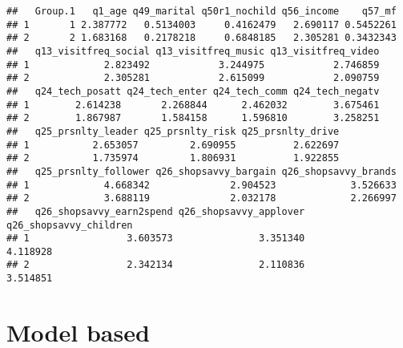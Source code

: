 \documentclass[]{article}
\newenvironment{Shaded}{\begin{snugshade}}{\end{snugshade}}
\newcommand{\KeywordTok}[1]{\textcolor[rgb]{0.13,0.29,0.53}{\textbf{#1}}}
\newcommand{\DataTypeTok}[1]{\textcolor[rgb]{0.13,0.29,0.53}{#1}}
\newcommand{\DecValTok}[1]{\textcolor[rgb]{0.00,0.00,0.81}{#1}}
\newcommand{\StringTok}[1]{\textcolor[rgb]{0.31,0.60,0.02}{#1}}
\newcommand{\OperatorTok}[1]{\textcolor[rgb]{0.81,0.36,0.00}{\textbf{#1}}}
\newcommand{\NormalTok}[1]{#1}
\begin{document}
\begin{verbatim}
##   Group.1   q1_age q49_marital q50r1_nochild q56_income    q57_mf
## 1       1 2.387772   0.5134003     0.4162479   2.690117 0.5452261
## 2       2 1.683168   0.2178218     0.6848185   2.305281 0.3432343
##   q13_visitfreq_social q13_visitfreq_music q13_visitfreq_video
## 1             2.823492            3.244975            2.746859
## 2             2.305281            2.615099            2.090759
##   q24_tech_posatt q24_tech_enter q24_tech_comm q24_tech_negatv
## 1        2.614238       2.268844      2.462032        3.675461
## 2        1.867987       1.584158      1.596810        3.258251
##   q25_prsnlty_leader q25_prsnlty_risk q25_prsnlty_drive
## 1           2.653057         2.690955          2.622697
## 2           1.735974         1.806931          1.922855
##   q25_prsnlty_follower q26_shopsavvy_bargain q26_shopsavvy_brands
## 1             4.668342              2.904523             3.526633
## 2             3.688119              2.032178             2.266997
##   q26_shopsavvy_earn2spend q26_shopsavvy_applover q26_shopsavvy_children
## 1                 3.603573               3.351340               4.118928
## 2                 2.342134               2.110836               3.514851
\end{verbatim}

\section{Model based}\label{model-based}

\begin{Shaded}
\end{Shaded}
\end{document}
